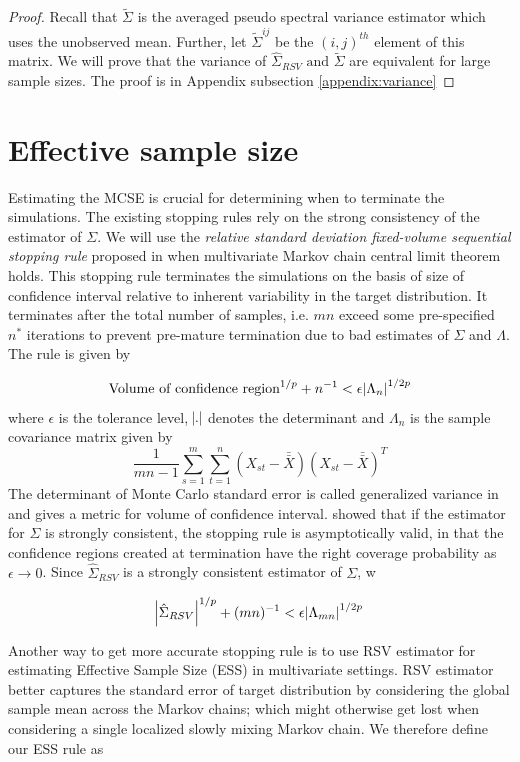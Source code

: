 \documentclass[12pt]{article}
\theoremstyle{remark}
\begin{document}
\begin{proof}
Recall that $\tilde{\Sigma}$ is the averaged pseudo spectral variance estimator which uses the unobserved mean. Further, let $\tilde{\Sigma}^{ij}$ be the $(i,j)^{th}$ element of this matrix. We will prove that the variance of $\hat{\Sigma}_{RSV} \textrm{ and } \tilde{\Sigma}$ are equivalent for large sample sizes. The proof is in Appendix subsection \ref{appendix:variance}
\end{proof}


\section{Effective sample size} \label{sec:ess}

Estimating the MCSE is crucial for determining when to terminate the simulations. The existing stopping rules rely on the strong consistency of the estimator of $\Sigma$. We will use the \textit{relative standard deviation fixed-volume sequential stopping rule} proposed in \cite{vats2019multivariate} when multivariate Markov chain central limit theorem holds. This stopping rule terminates the simulations on the basis of size of confidence interval relative to inherent variability in the target distribution. It terminates after the total number of samples, i.e. $mn$ exceed some pre-specified $n^*$ iterations to prevent pre-mature termination due to bad estimates of $\Sigma$ and $\Lambda$. The rule is given by

\[
\textrm{Volume of confidence region}^{1/p} + n^{-1} < \epsilon \abs{\Lambda_n}^{1/2p} 
\]
%
where $\epsilon$ is the tolerance level, $\abs{.}$ denotes the determinant and $\Lambda_n$ is the sample covariance matrix given by
%
\[
\dfrac{1}{mn-1}\sum_{s=1}^{m}\sum_{t=1}^{n}(X_{st} - \bar{\bar{X}})(X_{st} - \bar{\bar{X}})^T
\]
%
The determinant of Monte Carlo standard error is called generalized variance in  \cite{wilks1932certain} and gives a metric for volume of confidence interval. \cite{vats2019multivariate} showed that if the estimator for $\Sigma$ is strongly consistent, the stopping rule is asymptotically valid, in that the confidence regions created at termination have the right coverage probability as $\epsilon \to 0$. Since $\hat{\Sigma}_{RSV}$ is a strongly consistent estimator of $\Sigma$, w

\[
\abs{\hat{\Sigma}_{RSV}}^{1/p} + (mn)^{-1} < \epsilon \abs{\Lambda_{mn}}^{1/2p}
\]

Another way to get more accurate stopping rule is to use RSV estimator for estimating Effective Sample Size (ESS) in multivariate settings. RSV estimator better captures the standard error of target distribution by considering the global sample mean across the Markov chains; which might otherwise get lost when considering a single localized slowly mixing Markov chain. We therefore define our ESS rule as
\end{document}
